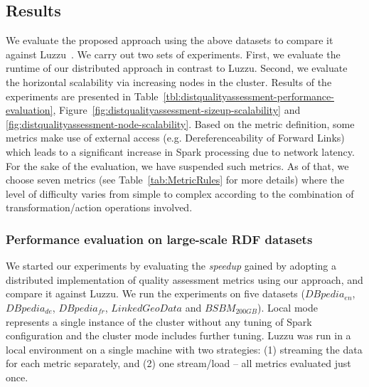 \subsection{Results}
We evaluate the proposed approach using the above datasets to compare it against Luzzu~\cite{debattista2016luzzu}.
We carry out two sets of experiments.
First, we evaluate the runtime of our distributed approach in contrast to Luzzu.
Second, we evaluate the horizontal scalability via increasing nodes in the cluster.
Results of the experiments are presented in Table~\ref{tbl:distqualityassessment-performance-evaluation}, Figure~\ref{fig:distqualityassessment-sizeup-scalability} and
\ref{fig:distqualityassessment-node-scalability}.
Based on the metric definition, some metrics make use of external access (e.g. Dereferenceability of Forward Links) which leads to a significant increase in Spark processing due to network latency. 
For the sake of the evaluation, we have suspended such metrics.
As of that, we choose seven metrics (see Table~\ref{tab:MetricRules} for more details) where the level of difficulty varies from simple to complex according to the combination of transformation/action operations involved.

\subsubsection{Performance evaluation on large-scale RDF datasets}
\label{subsubsection:distqualityassessment-large_scale_datasets}
We started our experiments by evaluating the \textit{speedup} gained by adopting a distributed implementation of quality assessment metrics using our approach, and compare it against Luzzu.
We run the experiments on five datasets
($DBpedia_{en}$, $DBpedia_{de}$, $DBpedia_{fr}$, $LinkedGeoData$ and $BSBM_{200GB}$).
Local mode represents a single instance of the cluster without any tuning of Spark configuration and the cluster mode includes further tuning.
Luzzu was run in a local environment on a single machine with two strategies: (1) streaming the data for each metric separately, and (2) one stream/load -- all metrics evaluated just once. 

